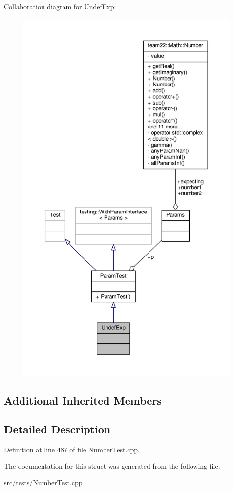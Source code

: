 Collaboration diagram for Undef\+Exp\+:
\nopagebreak
\begin{figure}[H]
\begin{center}
\leavevmode
\includegraphics[height=550pt]{struct_undef_exp__coll__graph}
\end{center}
\end{figure}
\subsection*{Additional Inherited Members}


\subsection{Detailed Description}


Definition at line 487 of file Number\+Test.\+cpp.



The documentation for this struct was generated from the following file\+:\begin{DoxyCompactItemize}
\item 
src/tests/\hyperlink{_number_test_8cpp}{Number\+Test.\+cpp}\end{DoxyCompactItemize}
